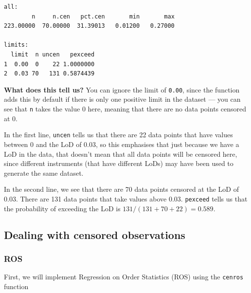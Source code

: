 \documentclass[
  letterpaper,
  DIV=11,
  numbers=noendperiod]{scrartcl}
\newenvironment{Shaded}{\begin{snugshade}}{\end{snugshade}}
\newcommand{\AttributeTok}[1]{\textcolor[rgb]{0.40,0.45,0.13}{#1}}
\newcommand{\ConstantTok}[1]{\textcolor[rgb]{0.56,0.35,0.01}{#1}}
\newcommand{\DocumentationTok}[1]{\textcolor[rgb]{0.37,0.37,0.37}{\textit{#1}}}
\newcommand{\FunctionTok}[1]{\textcolor[rgb]{0.28,0.35,0.67}{#1}}
\newcommand{\NormalTok}[1]{\textcolor[rgb]{0.00,0.23,0.31}{#1}}
\newcommand{\OtherTok}[1]{\textcolor[rgb]{0.00,0.23,0.31}{#1}}
\newcommand{\SpecialCharTok}[1]{\textcolor[rgb]{0.37,0.37,0.37}{#1}}
\begin{document}
\begin{Shaded}
\end{Shaded}

\begin{verbatim}
all:
        n     n.cen   pct.cen       min       max 
223.00000  70.00000  31.39013   0.01200   0.27000 

limits:
  limit  n uncen   pexceed
1  0.00  0    22 1.0000000
2  0.03 70   131 0.5874439
\end{verbatim}

\textbf{What does this tell us?} You can ignore the limit of
\texttt{0.00}, since the function adds this by default if there is only
one positive limit in the dataset --- you can see that \texttt{n} takes
the value 0 here, meaning that there are no data points censored at 0.

In the first line, \texttt{uncen} tells us that there are 22 data points
that have values between 0 and the LoD of 0.03, so this emphasises that
just because we have a LoD in the data, that doesn't mean that all data
points will be censored here, since different instruments (that have
different LoDs) may have been used to generate the same dataset.

In the second line, we see that there are 70 data points censored at the
LoD of 0.03. There are 131 data points that take values above 0.03.
\texttt{pexceed} tells us that the probability of exceeding the LoD is
\(131/(131+70+22) = 0.589\).

\subsection{Dealing with censored
observations}\label{dealing-with-censored-observations}

\subsubsection{ROS}\label{ros}

First, we will implement Regression on Order Statistics (ROS) using the
\texttt{cenros} function

\begin{Shaded}
\end{Shaded}
\end{document}
